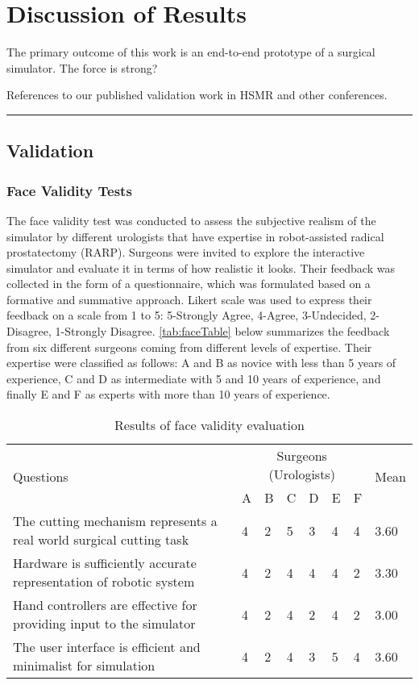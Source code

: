 
\chapter{Discussion of Results}\label{chp:discussion}

The primary outcome of this work is an end-to-end prototype of a surgical simulator. The force is strong?

References to our published validation work in HSMR and other conferences.

\hrule%

\section{Validation}

\subsection{Face Validity Tests}\label{sec:face}
The face validity test was conducted to assess the subjective realism of the simulator by different urologists that have expertise in robot-assisted radical prostatectomy (RARP). Surgeons were invited to explore the interactive simulator and evaluate it in terms of how realistic it looks. Their feedback was collected in the form of a questionnaire, which was formulated based on a formative and summative approach. Likert scale was used to express their feedback on a scale from 1 to 5: 5-Strongly Agree, 4-Agree, 3-Undecided, 2-Disagree, 1-Strongly Disagree.
\autoref{tab:faceTable} below summarizes the feedback from six different surgeons coming from different levels of expertise. Their expertise were classified as follows: A and B as novice with less than 5 years of experience, C and D as intermediate with 5 and 10 years of experience, and finally E and F as experts with more than 10 years of experience.

\begin{table}
\small
\centering
\begin{tabular}{p{6cm}p{0.5cm}p{0.5cm}p{0.5cm}p{0.5cm}p{0.5cm}p{0.5cm}p{0.8cm}}
 \multirow{2}{4em}{Questions} & \multicolumn{6}{c}{Surgeons (Urologists)} & \multirow{2}{4em}{Mean}\\
  \cmidrule{2-7}
  & A & B & C & D & E & F &\\
  \toprule
  The cutting mechanism represents a real world surgical cutting task & 4& 2& 5& 3 & 4& 4 & 3.60\\
  \midrule
  Hardware is sufficiently accurate representation of robotic system
& 4& 2& 4 & 4 & 4 & 2 & 3.30\\
  \midrule
  Hand controllers are effective for providing input to the simulator
& 4 & 2 & 4& 2& 4 & 2 & 3.00\\
  \midrule
  The user interface is efficient and minimalist for simulation  & 4 & 2& 4 & 3 & 5& 4 & 3.60\\
  \bottomrule
\end{tabular}
\caption{Results of face validity evaluation}\label{tab:faceTable}
\end{table}

